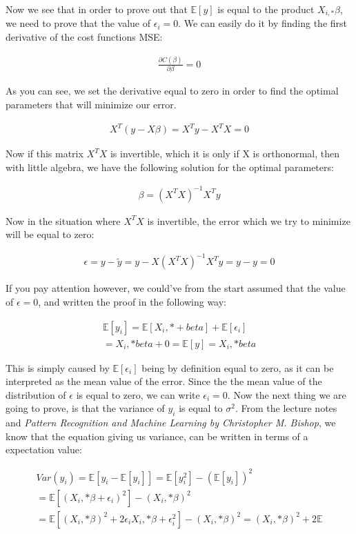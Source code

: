 \documentclass[a4paper, 10pt]{article}
\begin{document}
Now we see that in order to prove out that $\mathbb{E}[y]$ is equal to the product $X_{i,*}\beta$, we need to prove that the value of $\epsilon_{i} = 0$. We can easily do it by finding the first derivative of the cost functions MSE: 

\begin{gather*}
	\frac{\partial C(\beta)}{\partial \beta} = 0
\end{gather*}

As you can see, we set the derivative equal to zero in order to find the optimal parameters that will minimize our error. 

\begin{gather*}
	X^T(y-X\beta) = X^Ty - X^TX = 0
\end{gather*}

Now if this matrix $X^TX$ is invertible, which it is only if X is orthonormal, then with little algebra, we have the following solution for the optimal parameters: 

\begin{gather*}
	\beta = (X^TX)^{-1}X^Ty
\end{gather*}

Now in the situation where $X^TX$ is invertible, the error which we try to minimize will be equal to zero: 

\begin{gather*}
	\epsilon = y - \tilde{y} = y - X(X^TX)^{-1}X^Ty = y - y = 0 
\end{gather*}

If you pay attention however, we could've from the start assumed that the value of $\epsilon=0$, and written the proof in the following way: 

\begin{gather*}
	\mathbb{E}[y_i] = \mathbb{E}[X_i,*+beta] + \mathbb{E}[\epsilon_i] \\
						= X_i,*beta + 0 = \mathbb{E}[y] = X_i,*beta
\end{gather*}

This is simply caused by $\mathbb{E}[\epsilon_i]$ being by definition equal to zero, as it can be interpreted as the mean value of the error. Since the the mean value of the distribution of $\epsilon$ is equal to zero, we can write $\epsilon_i=0$. Now the next thing we are going to prove, is that the variance of $y_i$ is equal to $\sigma^2$. From the lecture notes and \emph{Pattern Recognition and Machine Learning by Christopher M. Bishop}, we know that the equation giving us variance, can be written in terms of a expectation value: 

\begin{gather*}
			Var(y_i) = \mathbb{E}[y_i - \mathbb{E}[y_i]] = \mathbb{E}[y_i^2] - (\mathbb{E}[y_i])^2 \\
										= \mathbb{E}[(X_i,*\beta + \epsilon_i)^2] - (X_i,*\beta)^2 \\
										= \mathbb{E}[(X_i,*\beta)^2 + 2\epsilon_iX_i,*\beta + \epsilon_i^2] - (X_i,*\beta)^2
										= (X_i,*\beta)^2 + 2\mathbb{E}
\end{gather*}
\end{document}
